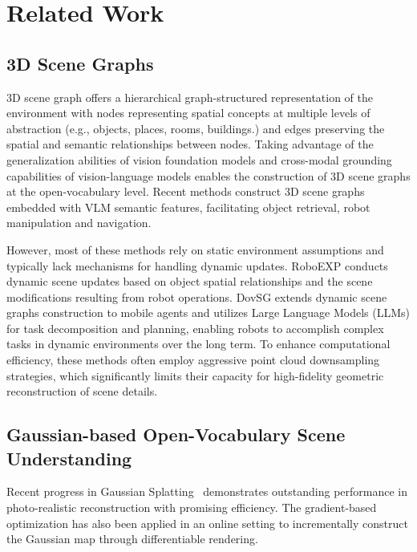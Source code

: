 \section{Related Work}  \label{sec:related_work}
\subsection{3D Scene Graphs}
\label{sec:3d_scene_graph}
3D scene graph \cite{rosinol20203ddynamicscenegraphs,hughes2024foundations} offers a hierarchical graph-structured representation of the environment with nodes representing spatial concepts at multiple levels of abstraction (e.g., objects, places, rooms, buildings.) and edges preserving the spatial and semantic relationships between nodes. Taking advantage of the generalization abilities of vision foundation models \cite{cheng2024yoloworldrealtimeopenvocabularyobject,kirillov2023segment, liu2024groundingdinomarryingdino, zhang2023recognizeanythingstrongimage} and cross-modal grounding capabilities of vision-language models \cite{radford2021learningtransferablevisualmodels, zhai2023sigmoidlosslanguageimage} enables the construction of 3D scene graphs at the open-vocabulary level. Recent methods \cite{gu2023conceptgraphsopenvocabulary3dscene, werby23hovsg, linok2024barequeriesopenvocabularyobject, yan2025dynamicopenvocabulary3dscene, jiang2024roboexpactionconditionedscenegraph} construct 3D scene graphs embedded with VLM semantic features, facilitating object retrieval, robot manipulation and navigation. 
 
However, most of these methods \cite{gu2023conceptgraphsopenvocabulary3dscene, werby23hovsg,linok2024barequeriesopenvocabularyobject} rely on static environment assumptions and typically lack mechanisms for handling dynamic updates. RoboEXP \cite{jiang2024roboexpactionconditionedscenegraph} conducts dynamic scene updates based on object spatial relationships and the scene modifications resulting from robot operations. DovSG \cite{yan2025dynamicopenvocabulary3dscene} extends dynamic scene graphs construction to mobile agents and utilizes Large Language Models (LLMs) \cite{openai2024gpt4technicalreport} for task decomposition and planning, enabling robots to accomplish complex tasks in dynamic environments over the long term. To enhance computational efficiency, these methods often employ aggressive point cloud downsampling strategies, which significantly limits their capacity for high-fidelity geometric reconstruction of scene details.

\subsection{Gaussian-based Open-Vocabulary Scene Understanding}
\label{sec:gaussian_open_vocab_understand}
Recent progress in Gaussian Splatting~\cite{kerbl20233d, Huang2DGS2024, yu2024mip, guedon2024sugar, cheng2024gaussianpro} demonstrates outstanding performance in photo-realistic reconstruction with promising efficiency. The gradient-based optimization has also been applied in an online setting to incrementally construct the Gaussian map \cite{keetha2024splatam,yan2024gs, matsuki2024gaussian, wei2024gsfusiononlinergbdmapping} through differentiable rendering.

